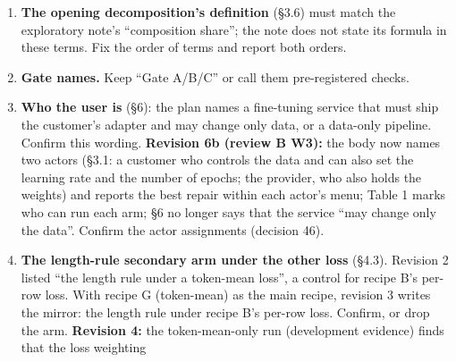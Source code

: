 \documentclass{article}
\theoremstyle{plain}
\theoremstyle{definition}
\theoremstyle{remark}
\begin{document}
\begin{enumerate}
        changing a verdict; the 8~pp floor stays primary. \S{}4.6 does not
        mention it yet; add one sentence when revision 5 is accepted.
        \textbf{Revision 5:} FOCUS 9 Oct 09:29 UTC keeps Gate B on recipe B, so
        the move to the common recipe above is void; DRAFT revision 5 ``stays on
        recipe B and adds the [D14]--[D19] rules'', and the brief's [D20] fixes
        the kit's price constants (no hourly limit; guard planning rate USD
        1.85/h; spend rate USD 1.79/h; reserve USD 6), with the money thresholds
        recomputed in revision 5 (FOCUS 13:16 UTC). The repository's DRAFT is
        still revision 4b, so \S{}4.6 marks revision 5 [NOT YET FIXED]. Update
        \S{}4.6 when revision 5 is accepted. \textbf{Revision 5e:} the user's
        USD 10/h pod-creation price limit (FOCUS 9 Oct 15:29 UTC) replaces ``no
        hourly limit''; brief revision 17 amends [D20]; the budget guard's
        planning rate (USD 1.85/h) is unchanged.
  \item \textbf{The opening decomposition's definition} (\S{}3.6) must match the
        exploratory note's ``composition share''; the note does not state its
        formula in these terms. Fix the order of terms and report both orders.
  \item \textbf{Gate names.} Keep ``Gate A/B/C'' or call them pre-registered
        checks.
  \item \textbf{Who the user is} (\S{}6): the plan names a fine-tuning service
        that must ship the customer's adapter and may change only data, or a
        data-only pipeline. Confirm this wording. \textbf{Revision 6b (review B
        W3):} the body now names two actors (\S{}3.1: a customer who controls
        the data and can also set the learning rate and the number of epochs;
        the provider, who also holds the weights) and reports the best repair
        within each actor's menu; Table 1 marks who can run each arm; \S{}6 no
        longer says that the service ``may change only the data''. Confirm the
        actor assignments (decision 46).
  \item \textbf{The length-rule secondary arm under the other loss} (\S{}4.3).
        Revision 2 listed ``the length rule under a token-mean loss'', a control
        for recipe B's per-row loss. With recipe G (token-mean) as the main
        recipe, revision 3 writes the mirror: the length rule under recipe B's
        per-row loss. Confirm, or drop the arm. \textbf{Revision 4:} the
        token-mean-only run (development evidence) finds that the loss weighting

\end{enumerate}
\end{document}
